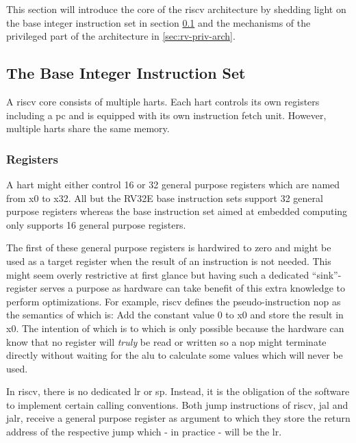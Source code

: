 This section will introduce the core of the \gls{riscv} architecture by shedding light on the base integer instruction set in section \ref{sec:rv-base-int-isa} and the mechanisms of the privileged part of the architecture in \ref{sec:rv-priv-arch}.

\subsection{The Base Integer Instruction Set}
\label{sec:rv-base-int-isa}

A \gls{riscv} core consists of multiple \glspl{hart}.
Each \gls{hart} controls its own registers including a \gls{pc} and is equipped with its own instruction fetch unit.
However, multiple \glspl{hart} share the same memory.

\subsubsection{Registers}
A \gls{hart} might either control 16 or 32 general purpose registers which are named from x0 to x32.
All but the RV32E base instruction sets support 32 general purpose registers whereas the base instruction set aimed at embedded computing only supports 16 general purpose registers.

The first of these general purpose registers is hardwired to zero and might be used as a target register when the result of an instruction is not needed.
This might seem overly restrictive at first glance but having such a dedicated \enquote{sink}-register serves a purpose as hardware can take benefit of this extra knowledge to perform optimizations.
For example, \gls{riscv} defines the pseudo-instruction \gls{nop} as  the semantics of which is: Add the constant value 0 to x0 and store the result in x0.
The intention of which is to  which is only possible because the hardware can know that no register will \textit{truly} be read or written so a \gls{nop} might terminate directly without waiting for the \gls{alu} to calculate some values which will never be used.

In \gls{riscv}, there is no dedicated \gls{lr} or \gls{sp}.
Instead, it is the obligation of the software to implement certain calling conventions.
Both jump instructions of \gls{riscv}, \gls{jal} and \gls{jalr}, receive a general purpose register as argument to which they store the return address of the respective jump which - in practice - will be the \gls{lr}.

